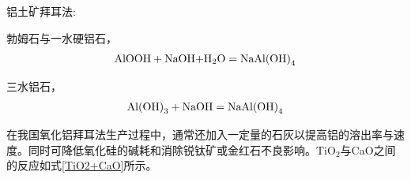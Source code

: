 铝土矿拜耳法:

勃姆石与一水硬铝石，
\begin{equation}
\begin{split}
{\rm{AlOOH + NaOH + }}{{\rm{H}}_{\rm{2}}}{\rm{O}} = {\rm{NaAl}}{\left( {{\rm{OH}}} \right)_{\rm{4}}}
\end{split}
\end{equation}

三水铝石，
\begin{equation}\label{bomushi}
\begin{split}
{\rm{Al}}{\left( {{\rm{OH}}} \right)_{\rm{3}}} + {\rm{NaOH} } = {\rm NaAl{\left( {OH} \right)_{\rm{4}}}}
\end{split}
\end{equation}

在我国氧化铝拜耳法生产过程中，通常还加入一定量的石灰以提高铝的溶出率与速度。同时可降低氧化硅的碱耗和消除锐钛矿或金红石不良影响。TiO$ _{\mathrm{2}} $与CaO之间的反应如式\eqref{TiO2+CaO}所示。
